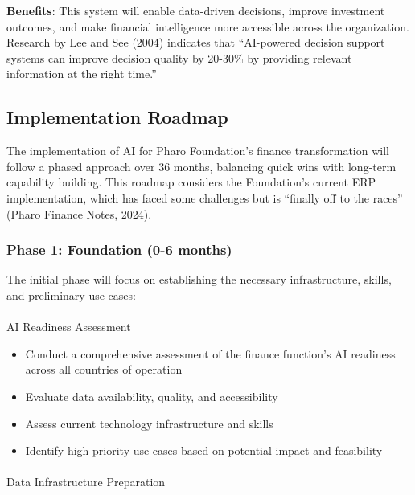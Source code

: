 \documentclass[
]{article}
\makeatletter
\let\oldparagraph\paragraph
\renewcommand{\paragraph}{
    \@ifstar
      \xxxParagraphStar
      \xxxParagraphNoStar
  }
\newcommand{\xxxParagraphStar}[1]{\oldparagraph*{#1}\mbox{}}
\newcommand{\xxxParagraphNoStar}[1]{\oldparagraph{#1}\mbox{}}
\providecommand{\tightlist}{%
  \setlength{\itemsep}{0pt}\setlength{\parskip}{0pt}}\usepackage{longtable,booktabs,array}
\makeatother
\begin{document}
\textbf{Benefits}: This system will enable data-driven decisions,
improve investment outcomes, and make financial intelligence more
accessible across the organization. Research by Lee and See (2004)
indicates that ``AI-powered decision support systems can improve
decision quality by 20-30\% by providing relevant information at the
right time.''

\subsection{Implementation Roadmap}\label{implementation-roadmap}

The implementation of AI for Pharo Foundation's finance transformation
will follow a phased approach over 36 months, balancing quick wins with
long-term capability building. This roadmap considers the Foundation's
current ERP implementation, which has faced some challenges but is
``finally off to the races'' (Pharo Finance Notes, 2024).

\subsubsection{Phase 1: Foundation (0-6
months)}\label{phase-1-foundation-0-6-months}

The initial phase will focus on establishing the necessary
infrastructure, skills, and preliminary use cases:

\paragraph{AI Readiness Assessment}\label{ai-readiness-assessment}

\begin{itemize}
\tightlist
\item
  Conduct a comprehensive assessment of the finance function's AI
  readiness across all countries of operation
\item
  Evaluate data availability, quality, and accessibility
\item
  Assess current technology infrastructure and skills
\item
  Identify high-priority use cases based on potential impact and
  feasibility
\end{itemize}

\paragraph{Data Infrastructure
Preparation}\label{data-infrastructure-preparation}
\end{document}
